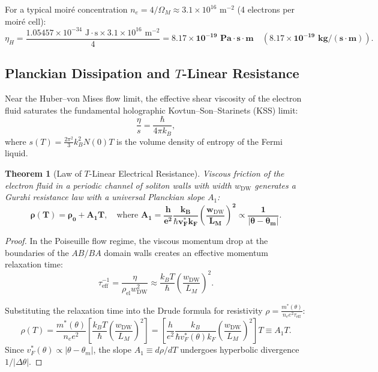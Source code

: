 \documentclass[12pt,a4paper]{article}
\newtheorem{theorem}{Theorem}
\begin{document}
For a typical moiré concentration $n_e = 4 / \Omega_M \approx 3.1 \times 10^{16}\text{ m}^{-2}$ (4 electrons per moiré cell):
\begin{equation}
\eta_H = \frac{1.05457 \times 10^{-34}\text{ J}\cdot\text{s} \times 3.1 \times 10^{16}\text{ m}^{-2}}{4} = \mathbf{8.17 \times 10^{-19}\text{ Pa}\cdot\text{s}\cdot\text{m}} \quad (\mathbf{8.17 \times 10^{-19}\text{ kg}/(\text{s}\cdot\text{m})}).
\end{equation}
										
\subsection{Planckian Dissipation and $T$-Linear Resistance}
Near the Huber--von Mises flow limit, the effective shear viscosity of the electron fluid saturates the fundamental holographic Kovtun--Son--Starinets (KSS) limit:
\begin{equation}
\frac{\eta}{s} = \frac{\hbar}{4\pi k_B},
\end{equation}
where $s(T) = \frac{2\pi^2}{3} k_B^2 N(0) T$ is the volume density of entropy of the Fermi liquid.
										
\begin{theorem}[Law of $T$-Linear Electrical Resistance]
Viscous friction of the electron fluid in a periodic channel of soliton walls with width $w_{\mathrm{DW}}$ generates a Gurzhi resistance law with a universal Planckian slope $A_1$:
\begin{equation}
\mathbf{\rho(T) = \rho_0 + A_1 T}, \quad \text{where } \mathbf{A_1 = \frac{h}{e^2} \frac{k_B}{\hbar v_F^* k_F} \left( \frac{w_{\mathrm{DW}}}{L_M} \right)^2 \propto \frac{1}{|\theta - \theta_m|}}.
\end{equation}	
\end{theorem}

\begin{proof}
In the Poiseuille flow regime, the viscous momentum drop at the boundaries of the $AB/BA$ domain walls creates an effective momentum relaxation time:
\begin{equation}
\tau_{\text{eff}}^{-1} = \frac{\eta}{\rho_{\text{el}} w_{\text{DW}}^2} \approx \frac{k_B T}{\hbar} \left( \frac{w_{\text{DW}}}{L_M} \right)^2.
\end{equation}

Substituting the relaxation time into the Drude formula for resistivity $\rho = \frac{m^*(\theta)}{n_e e^2 \tau_{\text{eff}}}$:
\begin{equation}
\rho(T) = \frac{m^*(\theta)}{n_e e^2} \left[ \frac{k_B T}{\hbar} \left( \frac{w_{\text{DW}}}{L_M} \right)^2 \right] = \left[ \frac{h}{e^2} \frac{k_B}{\hbar v_F^*(\theta) k_F} \left( \frac{w_{\text{DW}}}{L_M} \right)^2 \right] T \equiv A_1 T.
\end{equation}
Since $v_F^*(\theta) \propto |\theta - \theta_m|$, the slope $A_1 \equiv d\rho/dT$ undergoes hyperbolic divergence $1/|\Delta \theta|$.
\end{proof}
											
\end{document}
